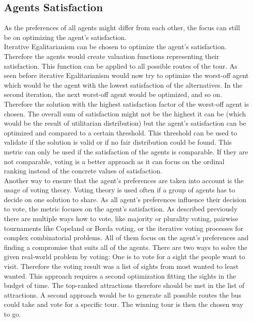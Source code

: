 \documentclass[german, a4paper, 11pt, oneside]{scrbook}
\begin{document}
\subsection{Agents Satisfaction}
As the preferences of all agents might differ from each other, the focus can still be on optimizing the agent's satisfaction. 
\\Iterative Egalitarianism can be chosen to optimize the agent's satisfaction. Therefore the agents would create valuation functions representing their satisfaction. This function can be applied to all possible routes of the tour. As seen before iterative Egalitarianism would now try to optimize the worst-off agent which would be the agent with the lowest satisfaction of the alternatives. In the second iteration, the next worst-off agent would be optimized, and so on. Therefore the solution with the highest satisfaction factor of the worst-off agent is chosen. The overall sum of satisfaction might not be the highest it can be (which would be the result of utilitarian distribution) but the agent's satisfaction can be optimized and compared to a certain threshold. This threshold can be used to validate if the solution is valid or if no fair distribution could be found. This metric can only be used if the satisfaction of the agents is comparable. If they are not comparable, voting is a better approach as it can focus on the ordinal ranking instead of the concrete values of satisfaction.
\\Another way to ensure that the agent's preferences are taken into account is the usage of voting theory. Voting theory is used often if a group of agents has to decide on one solution to share. As all agent's preferences influence their decision to vote, the metric focuses on the agent's satisfaction. As described previously there are multiple ways how to vote, like majority or plurality voting, pairwise tournaments like Copeland or Borda voting, or the iterative voting processes for complex combinatorial problems. All of them focus on the agent's preferences and finding a compromise that suits all of the agents. There are two ways to solve the given real-world problem by voting: One is to vote for a sight the people want to visit. Therefore the voting result was a list of sights from most wanted to least wanted. This approach requires a second optimization fitting the sights in the budget of time. The top-ranked attractions therefore should be met in the list of attractions. A second approach would be to generate all possible routes the bus could take and vote for a specific tour. The winning tour is then the chosen way to go.
\end{document}
